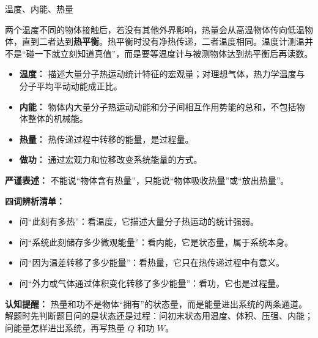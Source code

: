 \begin{conceptbox}{温度、内能、热量}

两个温度不同的物体接触后，若没有其他外界影响，热量会从高温物体传向低温物体，直到二者达到\textbf{热平衡}。热平衡时没有净热传递，二者温度相同。温度计测温并不是“碰一下就立刻知道真值”，而是要等温度计与被测物体达到热平衡后再读数。

\begin{center}


\label{fig:thermal-equilibrium-thermometer}
\end{center}

\begin{itemize}
  \item \textbf{温度：} 描述大量分子热运动统计特征的宏观量；对理想气体，热力学温度与分子平均平动动能成正比。
  \item \textbf{内能：} 物体内大量分子热运动动能和分子间相互作用势能的总和，不包括物体整体的机械能。
  \item \textbf{热量：} 热传递过程中转移的能量，是过程量。
  \item \textbf{做功：} 通过宏观力和位移改变系统能量的方式。
\end{itemize}

\textbf{严谨表述：} 不能说“物体含有热量”，只能说“物体吸收热量”或“放出热量”。

\begin{center}


\label{fig:thermal-state-process-map}
\end{center}

\textbf{四词辨析清单：}
\begin{itemize}
  \item 问“此刻有多热”：看温度，它描述大量分子热运动的统计强弱。
  \item 问“系统此刻储存多少微观能量”：看内能，它是状态量，属于系统本身。
  \item 问“因为温差转移了多少能量”：看热量，它只在热传递过程中有意义。
  \item 问“外力或气体通过体积变化转移了多少能量”：看功，它也是过程量。
\end{itemize}

\textbf{认知提醒：} 热量和功不是物体“拥有”的状态量，而是能量进出系统的两条通道。解题时先判断题目问的是状态还是过程：问初末状态用温度、体积、压强、内能；问能量怎样进出系统，再写热量 $Q$ 和功 $W$。
\end{conceptbox}

